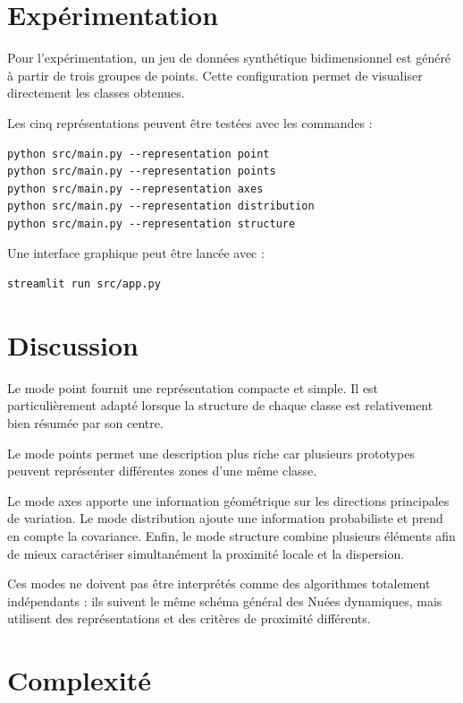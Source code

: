 \documentclass[12pt,a4paper]{article}
\begin{document}
\section{Expérimentation}

Pour l'expérimentation, un jeu de données synthétique bidimensionnel est généré à partir de trois groupes de points. Cette configuration permet de visualiser directement les classes obtenues.

Les cinq représentations peuvent être testées avec les commandes :

\begin{verbatim}
python src/main.py --representation point
python src/main.py --representation points
python src/main.py --representation axes
python src/main.py --representation distribution
python src/main.py --representation structure
\end{verbatim}

Une interface graphique peut être lancée avec :

\begin{verbatim}
streamlit run src/app.py
\end{verbatim}

\section{Discussion}

Le mode point fournit une représentation compacte et simple. Il est particulièrement adapté lorsque la structure de chaque classe est relativement bien résumée par son centre.

Le mode points permet une description plus riche car plusieurs prototypes peuvent représenter différentes zones d'une même classe.

Le mode axes apporte une information géométrique sur les directions principales de variation. Le mode distribution ajoute une information probabiliste et prend en compte la covariance. Enfin, le mode structure combine plusieurs éléments afin de mieux caractériser simultanément la proximité locale et la dispersion.

Ces modes ne doivent pas être interprétés comme des algorithmes totalement indépendants : ils suivent le même schéma général des Nuées dynamiques, mais utilisent des représentations et des critères de proximité différents.

\section{Complexité}
\end{document}
